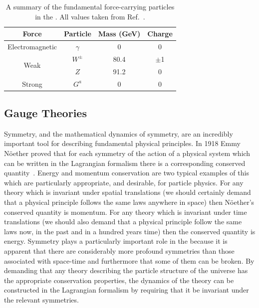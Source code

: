 \begin{table}
  \begin{tabular}{c | c c c}
  Force & Particle & Mass (GeV) & Charge \\
  \hline
  Electromagnetic & $\gamma$ & 0 & 0 \\
  \multirow{2}{*}{Weak} & $W^{\pm}$ & 80.4 & $\pm$1 \\
                        & $Z$   & 91.2 & 0 \\
  Strong                & $G^{a}$   & 0 & 0 \\   
  \end{tabular}
  \caption[A summary of the fundamental force-carrying particles in the \acs{SM}]{A summary of the fundamental force-carrying particles in the \SM. All values taken from Ref.~\cite{pdg}.}
  \label{tab:forces}
\end{table}

\subsection{Gauge Theories}

Symmetry, and the mathematical dynamics of symmetry, are an incredibly important tool for describing fundamental physical principles. In 1918 Emmy N\"{o}ether proved that for each symmetry of the action of a physical system which can be written in the Lagrangian formalism there is a corresponding conserved quantity~\cite{noether,noether_trans}. Energy and momentum conservation are two typical examples of this which are particularly appropriate, and desirable, for particle physics. For any theory which is invariant under spatial translations (we should certainly demand that a physical principle follows the same laws anywhere in space) then N\"{o}ether's conserved quantity is momentum. For any theory which is invariant under time translations (we should also demand that a physical principle follow the same laws now, in the past and in a hundred years time) then the conserved quantity is energy. Symmetry plays a particularly important role in the \SM because it is apparent that there are considerably more profound symmetries than those associated with space-time and furthermore that some of them can be broken. By demanding that any theory describing the particle structure of the universe has the appropriate conservation properties, the dynamics of the theory can be constructed in the Lagrangian formalism by requiring that it be invariant under the relevant symmetries. 

